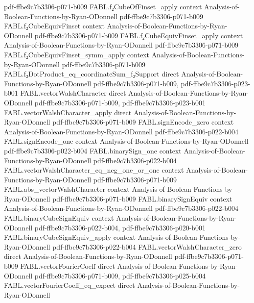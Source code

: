 \begin{theorem}
  {pdf-ffbe9c7b3306-p071-b009}
\proofstep
  {FABL.f₂CubeOfFinset_apply}
  {context}
  {Analysis-of-Boolean-Functions-by-Ryan-ODonnell}
  {pdf-ffbe9c7b3306-p071-b009}
\proofstep
  {FABL.f₂CubeEquivFinset}
  {context}
  {Analysis-of-Boolean-Functions-by-Ryan-ODonnell}
  {pdf-ffbe9c7b3306-p071-b009}
\proofstep
  {FABL.f₂CubeEquivFinset_apply}
  {context}
  {Analysis-of-Boolean-Functions-by-Ryan-ODonnell}
  {pdf-ffbe9c7b3306-p071-b009}
\proofstep
  {FABL.f₂CubeEquivFinset_symm_apply}
  {context}
  {Analysis-of-Boolean-Functions-by-Ryan-ODonnell}
  {pdf-ffbe9c7b3306-p071-b009}
\proofstep
  {FABL.f₂DotProduct_eq_coordinateSum_f₂Support}
  {direct}
  {Analysis-of-Boolean-Functions-by-Ryan-ODonnell}
  {pdf-ffbe9c7b3306-p071-b009,
    pdf-ffbe9c7b3306-p023-b001}
\proofstep
  {FABL.vectorWalshCharacter}
  {direct}
  {Analysis-of-Boolean-Functions-by-Ryan-ODonnell}
  {pdf-ffbe9c7b3306-p071-b009,
    pdf-ffbe9c7b3306-p023-b001}
\proofstep
  {FABL.vectorWalshCharacter_apply}
  {direct}
  {Analysis-of-Boolean-Functions-by-Ryan-ODonnell}
  {pdf-ffbe9c7b3306-p071-b009}
\proofstep
  {FABL.signEncode_zero}
  {context}
  {Analysis-of-Boolean-Functions-by-Ryan-ODonnell}
  {pdf-ffbe9c7b3306-p022-b004}
\proofstep
  {FABL.signEncode_one}
  {context}
  {Analysis-of-Boolean-Functions-by-Ryan-ODonnell}
  {pdf-ffbe9c7b3306-p022-b004}
\proofstep
  {FABL.binarySign_one}
  {context}
  {Analysis-of-Boolean-Functions-by-Ryan-ODonnell}
  {pdf-ffbe9c7b3306-p022-b004}
\proofstep
  {FABL.vectorWalshCharacter_eq_neg_one_or_one}
  {context}
  {Analysis-of-Boolean-Functions-by-Ryan-ODonnell}
  {pdf-ffbe9c7b3306-p071-b009}
\proofstep
  {FABL.abs_vectorWalshCharacter}
  {context}
  {Analysis-of-Boolean-Functions-by-Ryan-ODonnell}
  {pdf-ffbe9c7b3306-p071-b009}
\proofstep
  {FABL.binarySignEquiv}
  {context}
  {Analysis-of-Boolean-Functions-by-Ryan-ODonnell}
  {pdf-ffbe9c7b3306-p022-b004}
\proofstep
  {FABL.binaryCubeSignEquiv}
  {context}
  {Analysis-of-Boolean-Functions-by-Ryan-ODonnell}
  {pdf-ffbe9c7b3306-p022-b004,
    pdf-ffbe9c7b3306-p020-b001}
\proofstep
  {FABL.binaryCubeSignEquiv_apply}
  {context}
  {Analysis-of-Boolean-Functions-by-Ryan-ODonnell}
  {pdf-ffbe9c7b3306-p022-b004}
\proofstep
  {FABL.vectorWalshCharacter_zero}
  {direct}
  {Analysis-of-Boolean-Functions-by-Ryan-ODonnell}
  {pdf-ffbe9c7b3306-p071-b009}
\proofstep
  {FABL.vectorFourierCoeff}
  {direct}
  {Analysis-of-Boolean-Functions-by-Ryan-ODonnell}
  {pdf-ffbe9c7b3306-p071-b009,
    pdf-ffbe9c7b3306-p025-b004}
\proofstep
  {FABL.vectorFourierCoeff_eq_expect}
  {direct}
  {Analysis-of-Boolean-Functions-by-Ryan-ODonnell}

\end{theorem}
